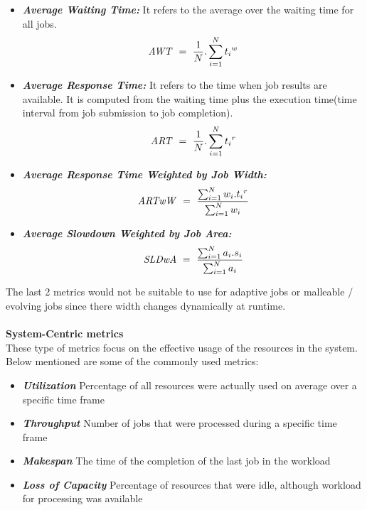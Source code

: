 \begin{itemize}
\item \textbf{\textit{Average Waiting Time:}} It refers to the average over the waiting time for all jobs.
\boldmath\begin{equation*}
\centering
\text{\textit{AWT}}\ =\ \frac{1}{N}.\sum_{i=1}^{N}{t_{i}}^{w}
\end{equation*}
\item \textbf{\textit{Average Response Time:}} It refers to the time when job results are available. It is computed from the waiting time plus the execution time(time interval from job submission to job completion).
\boldmath\begin{equation*}
\centering
\text{\textit{ART}}\ =\ \frac{1}{N}.\sum_{i=1}^{N}{t_{i}}^{r}
\end{equation*}
\item \textbf{\textit{Average Response Time Weighted by Job Width:}}
\boldmath\begin{equation*}
\centering
\text{\textit{ARTwW}}\ =\ \frac{\sum_{i=1}^{N}{w_{i}.t_{i}}^{r}}{\sum_{i=1}^{N}{w_{i}}}
\end{equation*}
\item \textbf{\textit{Average Slowdown Weighted by Job Area:}}
\boldmath\begin{equation*}
\centering
\text{\textit{SLDwA}}\ =\ \frac{\sum_{i=1}^{N}{a_{i}.s_{i}}}{\sum_{i=1}^{N}{a_{i}}}
\end{equation*}
\end{itemize}
The last 2 metrics would not be suitable to use for adaptive jobs or malleable / evolving jobs since there width changes dynamically at runtime.\\ \\
\textbf{System-Centric metrics}\\
These type of metrics focus on the effective usage of the resources in the system. Below mentioned are some of the commonly used metrics:
\begin{itemize}
\item \textbf{\textit{Utilization}} Percentage of all resources were actually used on average over a specific time frame
\item \textbf{\textit{Throughput}} Number of jobs that were processed during a specific time frame
\item \textbf{\textit{Makespan}} The time of the completion of the last job in the workload
\item \textbf{\textit{Loss of Capacity}} Percentage of resources that were idle, although workload for processing was available
\end{itemize}

